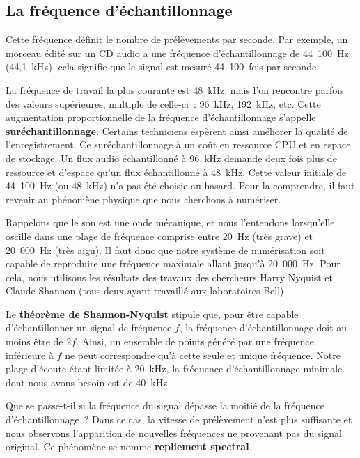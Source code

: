 \documentclass[
  letterpaper,
  DIV=11,
  numbers=noendperiod]{scrreprt}
\begin{document}
\hypertarget{la-fruxe9quence-duxe9chantillonnage}{%
\subsection{La fréquence
d'échantillonnage}\label{la-fruxe9quence-duxe9chantillonnage}}

Cette fréquence définit le nombre de prélèvements par seconde. Par
exemple, un morceau édité sur un CD audio a une fréquence
d'échantillonnage de 44~100~Hz (44,1~kHz), cela signifie que le signal
est mesuré 44~100~fois par seconde.

La fréquence de travail la plus courante est 48~kHz, mais l'on rencontre
parfois des valeurs supérieures, multiple de celle-ci~: 96~kHz, 192~kHz,
etc. Cette augmentation proportionnelle de la fréquence
d'échantillonnage s'appelle \textbf{suréchantillonnage}. Certains
techniciens espèrent ainsi améliorer la qualité de l'enregistrement. Ce
suréchantillonnage à un coût en ressource CPU et en espace de stockage.
Un flux audio échantillonné à 96~kHz demande deux fois plus de ressource
et d'espace qu'un flux échantillonné à 48~kHz. Cette valeur initiale de
44~100~Hz (ou 48~kHz) n'a pas été choisie au hasard. Pour la comprendre,
il faut revenir au phénomène physique que nous cherchons à numériser.

Rappelons que le son est une onde mécanique, et nous l'entendons
lorsqu'elle oscille dans une plage de fréquence comprise entre 20~Hz
(très grave) et 20~000~Hz (très aigu). Il faut donc que notre système de
numérisation soit capable de reproduire une fréquence maximale allant
jusqu'à 20~000~Hz. Pour cela, nous utilisons les résultats des travaux
des chercheurs Harry Nyquist et Claude Shannon (tous deux ayant
travaillé aux laboratoires Bell).

Le \textbf{théorème de Shannon-Nyquist} stipule que, pour être capable
d'échantillonner un signal de fréquence \(f\), la fréquence
d'échantillonnage doit au moins être de \(2f\). Ainsi, un ensemble de
points généré par une fréquence inférieure à \(f\) ne peut correspondre
qu'à cette seule et unique fréquence. Notre plage d'écoute étant limitée
à 20~kHz, la fréquence d'échantillonnage minimale dont nous avons besoin
est de 40~kHz.

Que se passe-t-il si la fréquence du signal dépasse la moitié de la
fréquence d'échantillonnage~? Dans ce cas, la vitesse de prélèvement
n'est plus suffisante et nous observons l'apparition de nouvelles
fréquences ne provenant pas du signal original. Ce phénomène se nomme
\textbf{repliement spectral}.
\end{document}
